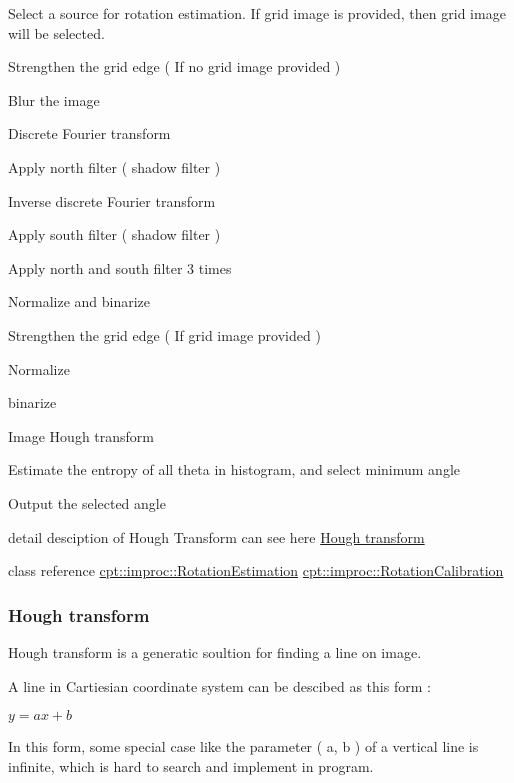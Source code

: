 \begin{DoxyEnumerate}
\item Select a source for rotation estimation. If grid image is provided, then grid image will be selected.
\item Strengthen the grid edge ( If no grid image provided )
\begin{DoxyEnumerate}
\item Blur the image
\item Discrete Fourier transform
\item Apply north filter ( shadow filter )
\item Inverse discrete Fourier transform
\item Apply south filter ( shadow filter )
\item Apply north and south filter 3 times
\item Normalize and binarize
\end{DoxyEnumerate}
\item Strengthen the grid edge ( If grid image provided )
\begin{DoxyEnumerate}
\item Normalize
\item binarize
\end{DoxyEnumerate}
\item Image Hough transform
\item Estimate the entropy of all theta in histogram, and select minimum angle
\item Output the selected angle
\end{DoxyEnumerate}

detail desciption of Hough Transform can see here \hyperlink{hough_transform}{Hough transform}

class reference \hyperlink{classcpt_1_1improc_1_1_rotation_estimation}{cpt\-::improc\-::\-Rotation\-Estimation} \hyperlink{structcpt_1_1improc_1_1_rotation_calibration}{cpt\-::improc\-::\-Rotation\-Calibration} \hypertarget{hough_transform}{}\subsubsection{Hough transform}\label{hough_transform}
Hough transform is a generatic soultion for finding a line on image.

A line in Cartiesian coordinate system can be descibed as this form \-:

$ y = ax + b $

In this form, some special case like the parameter ( a, b ) of a vertical line is infinite, which is hard to search and implement in program.

